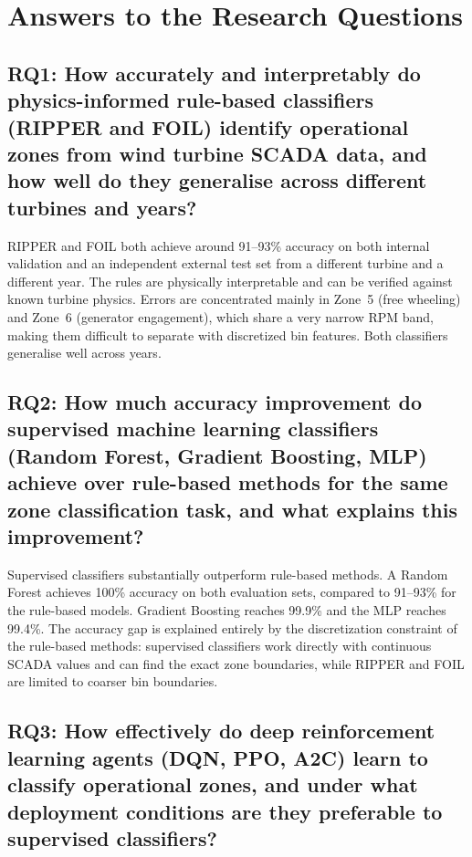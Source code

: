 \section{Answers to the Research Questions}
\label{sec:conc:rqa}

\subsection*{RQ1: How accurately and interpretably do physics-informed rule-based classifiers
(RIPPER and FOIL) identify operational zones from wind turbine SCADA data,
and how well do they generalise across different turbines and years?}

RIPPER and FOIL both achieve around 91--93\% accuracy on both internal validation
and an independent external test set from a different turbine and a different year.
The rules are physically interpretable and can be verified against known turbine physics.
Errors are concentrated mainly in Zone~5 (free wheeling) and Zone~6 (generator
engagement), which share a very narrow RPM band, making them difficult to separate with
discretized bin features. Both classifiers generalise well across years.

\subsection*{RQ2: How much accuracy improvement do supervised machine learning classifiers
(Random Forest, Gradient Boosting, MLP) achieve over rule-based methods for
the same zone classification task, and what explains this improvement?}

Supervised classifiers substantially outperform rule-based methods. A Random Forest
achieves 100\% accuracy on both evaluation sets, compared to 91--93\% for the
rule-based models. Gradient Boosting reaches 99.9\% and the MLP reaches 99.4\%.
The accuracy gap is explained entirely by the discretization constraint of the
rule-based methods: supervised classifiers work directly with continuous SCADA values
and can find the exact zone boundaries, while RIPPER and FOIL are limited to coarser
bin boundaries.

\subsection*{RQ3: How effectively do deep reinforcement learning agents (DQN, PPO, A2C) learn
to classify operational zones, and under what deployment conditions are they
preferable to supervised classifiers?}

